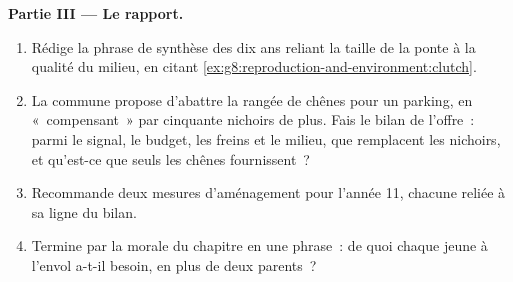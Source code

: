\begin{problem}
\medskip\noindent\textbf{Partie III --- Le rapport.}
\begin{enumerate}[resume]
  \item Rédige la phrase de synthèse des dix ans reliant la taille
        de la ponte à la qualité du milieu, en citant
        \cref{ex:g8:reproduction-and-environment:clutch}.
  \item La commune propose d'abattre la rangée de chênes pour un
        parking, en «~compensant~» par cinquante nichoirs de plus.
        Fais le bilan de l'offre~: parmi le signal, le budget, les
        freins et le milieu, que remplacent les nichoirs, et
        qu'est-ce que seuls les chênes fournissent~?
  \item Recommande deux mesures d'aménagement pour l'année 11,
        chacune reliée à sa ligne du bilan.
  \item Termine par la morale du chapitre en une phrase~: de quoi
        chaque jeune à l'envol a-t-il besoin, en plus de deux
        parents~?
\end{enumerate}
\end{problem}
